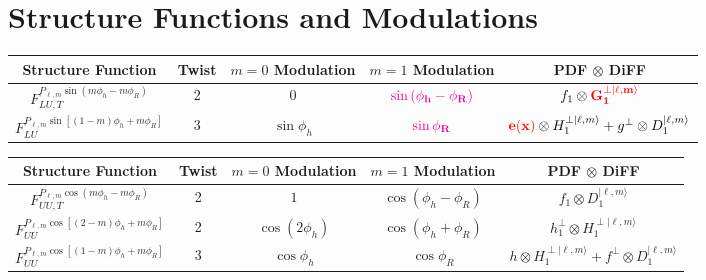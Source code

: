 \documentclass[12pt]{article}
\begin{document}
\section*{Structure Functions and Modulations}

\begin{center}
\begin{tabular}{|c|c|c|c|c|}
\hline

Structure Function & Twist & 
$m=0$ Modulation & $m=1$ Modulation & PDF $\otimes$ DiFF \\\hline\hline

$F_{LU,T}^{P_{\ell,m}\sin\left(m\phi_h-m\phi_R\right)}$ & 2 &
$0$ & ${\bf\color{magenta}\sin\left(\phi_h-\phi_R\right)}$ &
$f_1\otimes {\bf\color{red}G_1^{\perp|\ell,m\rangle}}$\\\hline

$F_{LU}^{P_{\ell,m}\sin\left[(1-m)\phi_h+m\phi_R\right]}$ & 3 &
$\sin\phi_h$ & ${\bf\color{magenta}\sin\phi_R}$ &
${\bf\color{red}e(x)}\otimes H_1^{\perp|\ell,m\rangle}+
g^{\perp}\otimes D_1^{|\ell,m\rangle}$\\\hline

\end{tabular}
\end{center}

\begin{center}
\begin{tabular}{|c|c|c|c|c|}
\hline

Structure Function & Twist & 
$m=0$ Modulation & $m=1$ Modulation & PDF $\otimes$ DiFF \\\hline\hline

$F_{UU,T}^{P_{\ell,m}\cos\left(m\phi_h-m\phi_R\right)}$ & 2 &
$1$ & $\cos\left(\phi_h-\phi_R\right)$ &
$f_1\otimes D_1^{|\ell,m\rangle}$\\\hline

$F_{UU}^{P_{\ell,m}\cos\left[(2-m)\phi_h+m\phi_R\right]}$ & 2 &
$\cos\left(2\phi_h\right)$ & $\cos\left(\phi_h+\phi_R\right)$ &
$h_1^{\perp}\otimes H_1^{\perp|\ell,m\rangle}$\\\hline

$F_{UU}^{P_{\ell,m}\cos\left[(1-m)\phi_h+m\phi_R\right]}$ & 3 &
$\cos\phi_h$ & $\cos\phi_R$ &
$h\otimes H_1^{\perp|\ell,m\rangle}+f^{\perp}\otimes D_1^{|\ell,m\rangle}$\\\hline

\end{tabular}
\end{center}
\end{document}
